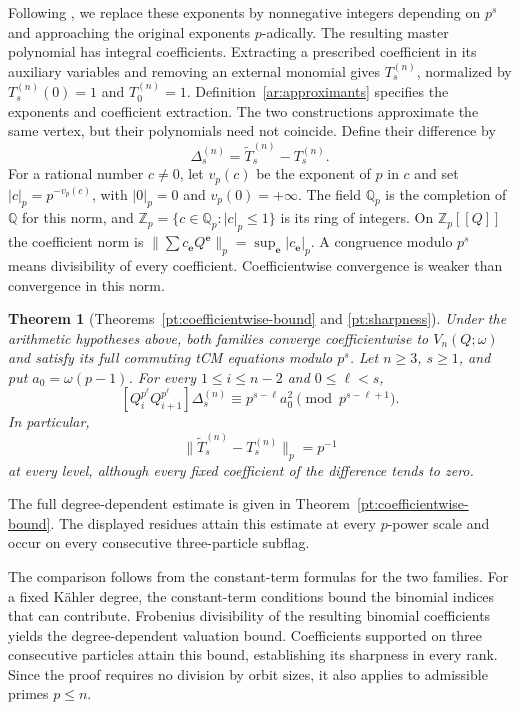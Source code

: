 \documentclass[11pt]{amsart}
\newtheorem{theorem}{Theorem}[section]
\theoremstyle{definition}
\theoremstyle{remark}
\numberwithin{equation}{section}
\newcommand{\Z}{\mathbb Z}
\newcommand{\Q}{\mathbb Q}
\begin{document}
Following \cite{SV23}, we replace these exponents by nonnegative
integers depending on $p^s$ and approaching the original exponents
$p$-adically. The resulting master polynomial has integral
coefficients. Extracting a prescribed coefficient in its auxiliary
variables and removing an external monomial gives
$T_s^{(n)}$, normalized by $T_s^{(n)}(0)=1$ and $T_0^{(n)}=1$.
Definition~\ref{ar:approximants} specifies the exponents and
coefficient extraction.
The two constructions approximate the same vertex, but their
polynomials need not coincide. Define their difference by
\[
 \Delta_s^{(n)}=\widetilde T_s^{(n)}-T_s^{(n)}.
\]
For a rational number $c\ne0$, let $v_p(c)$ be the exponent of
$p$ in $c$ and set $|c|_p=p^{-v_p(c)}$, with $|0|_p=0$
and $v_p(0)=+\infty$.
The field $\Q_p$ is the completion of $\Q$ for this norm, and
$\Z_p=\{c\in\Q_p:|c|_p\leq1\}$ is its ring of integers.
On $\Z_p[[Q]]$ the coefficient norm is
$\|\sum c_{\boldsymbol e}Q^{\boldsymbol e}\|_p
=\sup_{\boldsymbol e}|c_{\boldsymbol e}|_p$.
A congruence modulo $p^s$ means divisibility of every
coefficient. Coefficientwise convergence is weaker than
convergence in this norm.

\begin{theorem}[Theorems~\ref{pt:coefficientwise-bound} and
\ref{pt:sharpness}]\label{in:comparison-theorem}
Under the arithmetic hypotheses above, both families converge
coefficientwise to $V_n(Q;\omega)$ and satisfy its full commuting
tCM equations modulo $p^s$. Let $n\geq3$, $s\geq1$, and
put $a_0=\omega(p-1)$.
For every $1\leq i\leq n-2$ and $0\leq\ell<s$,
\begin{equation}\label{in:sharp-residue}
 [Q_i^{p^\ell}Q_{i+1}^{p^\ell}]\Delta_s^{(n)}
 \equiv p^{s-\ell}a_0^2\pmod{p^{s-\ell+1}}.
\end{equation}
In particular,
\begin{equation}\label{in:comparison-norm}
 \|\widetilde T_s^{(n)}-T_s^{(n)}\|_p=p^{-1}
\end{equation}
at every level, although every fixed coefficient of the
difference tends to zero.
\end{theorem}

The full degree-dependent estimate is given in
Theorem~\ref{pt:coefficientwise-bound}. The displayed residues
attain this estimate at every $p$-power scale and occur on every
consecutive three-particle subflag.

The comparison follows from the constant-term formulas for the
two families. For a fixed K\"ahler degree, the constant-term
conditions bound the binomial indices that can contribute.
Frobenius divisibility of the resulting binomial coefficients
yields the degree-dependent valuation bound. Coefficients
supported on three consecutive particles attain this bound,
establishing its sharpness in every rank. Since the proof
requires no division by orbit sizes, it also applies to
admissible primes $p\leq n$.
\end{document}
